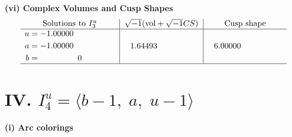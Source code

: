 \documentclass[1p]{elsarticle_modified}
\theoremstyle{definition}
\newcommand{\I}{\sqrt{-1}}
\begin{document}
\newpage\flushleft \textbf{(vi) Complex Volumes and Cusp Shapes}
$$\begin{array}{c|c|c}  
\text{Solutions to }I^u_{3}& \I (\text{vol} + \sqrt{-1}CS) & \text{Cusp shape}\\
 \hline 
\begin{aligned}
u &= -1.00000\phantom{ +0.000000I} \\
a &= -1.00000\phantom{ +0.000000I} \\
b &= \phantom{-0.000000 } 0\end{aligned}
 & \phantom{-}1.64493\phantom{ +0.000000I} & \phantom{-}6.00000\phantom{ +0.000000I}\\
 \hline 
 \end{array}$$\newpage\newpage\renewcommand{\arraystretch}{1}
\centering \section*{IV. $I^u_{4}= \langle b-1,\;a,\;u-1 \rangle$}
\flushleft \textbf{(i) Arc colorings}\\
\end{document}
